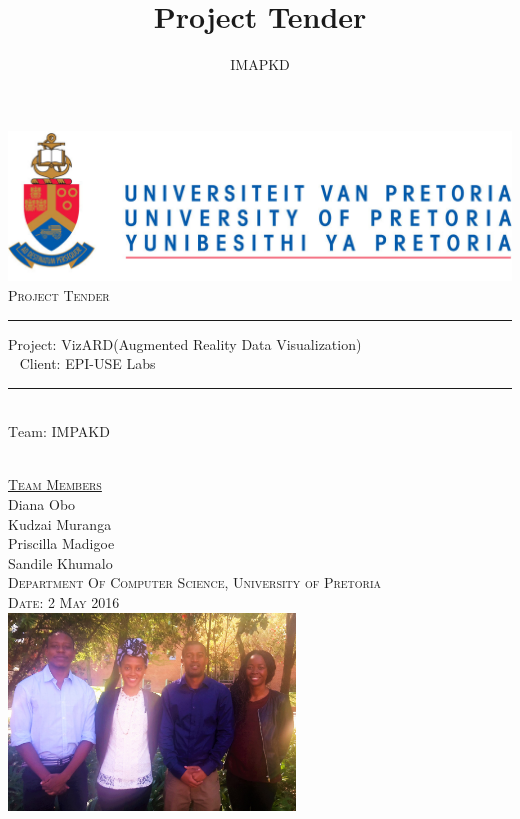 \documentclass[a4paper,12pt]{article}
\author{IMAPKD}
\title{ Project Tender}
\begin{document}
\setlength{\parskip}{6pt}

\begin{titlepage}

\begin{center}
\includegraphics[width=1\textwidth]{./University_of_Pretoria_Logo.PNG}\\[0.4cm]    
\textsc{\Large Project Tender}\\[0.5cm]
\rule{15cm}{0.5pt}

{ \huge \textsc Project: VizARD(Augmented Reality Data Visualization) }\\[0.4cm]\
{ \huge \textsc Client: EPI-USE Labs  }

\rule{15cm}{0.4pt}
\\[0.5cm]
{ \huge \textsc Team: IMPAKD  }\\[0.1cm]\

\textsc{\Large\underline{Team Members}}\\[0.5cm]

{\Large Diana {Obo}} \\[0.3cm]

{\Large Kudzai {Muranga}} \\[0.3cm]

{\Large Priscilla {Madigoe}}\\[0.3cm]

{\Large Sandile {Khumalo}}\\[0.5cm]

\textsc{ Department Of Computer Science, University of Pretoria}\\[0.3cm]
\textsc{Date: 2 May 2016}\\[0.3cm]

\includegraphics[width=3in]{./IMAPKD.jpg}

\vfill
\end{center}
\end{titlepage}
\end{document}
